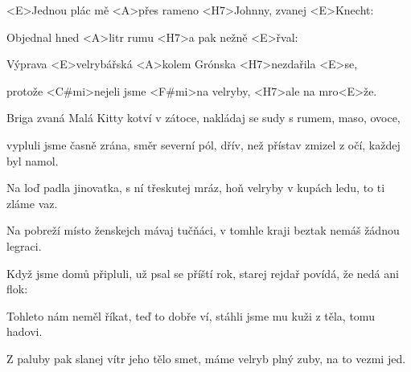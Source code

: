 

\zs
<E>Jednou plác mě <A>přes rameno <H7>Johnny, zvanej <E>Knecht:


Objednal hned <A>litr rumu <H7>a pak nežně <E>řval:

\ks

\zr
Výprava <E>velrybářská <A>kolem Grónska <H7>nezdařila <E>se,

protože <C#mi>nejeli jsme <F#mi>na velryby, <H7>ale na mro<E>že.
\kr

\zs
Briga zvaná Malá Kitty kotví v zátoce,
nakládaj se sudy s rumem, maso, ovoce,

vypluli jsme časně zrána, směr severní pól,
dřív, než přístav zmizel z očí, každej byl namol.
\ks

\zr \kr

\zs
Na loď padla jinovatka, s ní třeskutej mráz,
hoň velryby v kupách ledu, to ti zláme vaz.

Na pobreží místo ženskejch mávaj tučňáci,
v tomhle kraji beztak nemáš žádnou legraci.
\ks

\zr \kr

\zs
Když jsme domů připluli, už psal se příští rok,
starej rejdař povídá, že nedá ani flok:

\ks

\zr \kr

\zs
Tohleto nám neměl říkat, teď to dobře ví,
stáhli jsme mu kuži z těla, tomu hadovi.

Z paluby pak slanej vítr jeho tělo smet,
máme velryb plný zuby, na to vezmi jed.
\ks

\zr \kr

\kp
